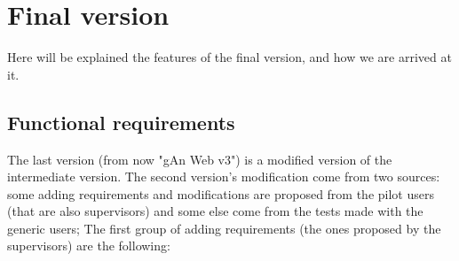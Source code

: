 
\chapter{Final version} %

\label{Chapter5} %

Here will be explained the features of the final version, and how we are arrived at it.

\section{Functional requirements}

The last version (from now "gAn Web v3") is a modified version of the intermediate version. 
The second version's modification come from two sources: some adding requirements and modifications are proposed from the pilot users (that are also supervisors) and some else come from the tests made with the generic users; The first group of adding requirements (the ones proposed by the supervisors) are the following:

